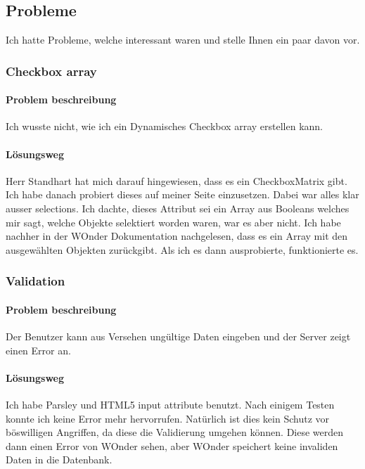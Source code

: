 \documentclass[a4paper, 11pt]{article}
\begin{document}
\subsection{Probleme}

Ich hatte Probleme, welche interessant waren und stelle Ihnen ein paar davon vor.

\subsubsection{Checkbox array}

\paragraph{Problem beschreibung}

Ich wusste nicht, wie ich ein Dynamisches Checkbox array erstellen kann.

\paragraph{Lösungsweg}

Herr Standhart hat mich darauf hingewiesen, dass es ein CheckboxMatrix gibt.
Ich habe danach probiert dieses auf meiner Seite einzusetzen.
Dabei war alles klar ausser selections. Ich dachte, dieses Attribut sei ein Array aus Booleans welches mir sagt, welche Objekte selektiert worden waren, war es aber nicht.
Ich habe nachher in der WOnder Dokumentation nachgelesen, dass es ein Array mit den ausgewählten Objekten zurückgibt.
Als ich es dann ausprobierte, funktionierte es.

\subsubsection{Validation}

\paragraph{Problem beschreibung}

Der Benutzer kann aus Versehen ungültige Daten eingeben und der Server zeigt einen Error an.

\paragraph{Lösungsweg}

Ich habe Parsley und HTML5 input attribute benutzt.
Nach einigem Testen konnte ich keine Error mehr hervorrufen.
Natürlich ist dies kein Schutz vor böswilligen Angriffen, da diese die Validierung umgehen können.
Diese werden dann einen Error von WOnder sehen, aber WOnder speichert keine invaliden Daten in die Datenbank.
\end{document}
